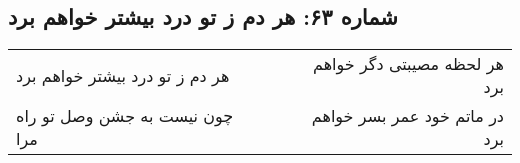 \begin{center}
\section*{شماره ۶۳: هر دم ز تو درد بیشتر خواهم برد}
\label{sec:063}
\begin{longtable}{l p{0.5cm} r}
هر دم ز تو درد بیشتر خواهم برد
&&
هر لحظه مصیبتی دگر خواهم برد
\\
چون نیست به جشن وصل تو راه مرا
&&
در ماتم خود عمر بسر خواهم برد
\\
\end{longtable}
\end{center}
